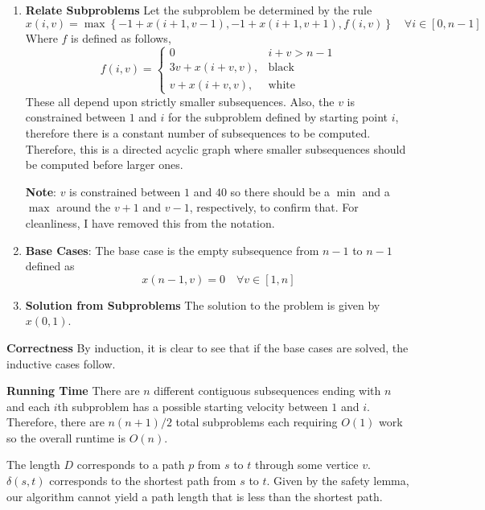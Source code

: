 \documentclass[12pt,twoside]{article}
\begin{document}
\begin{problems}
\begin{enumerate}
    \item {\bf Relate Subproblems} Let the subproblem be determined by the rule
    $$ x(i, v) = \max\left\{ -1 + x(i + 1, v - 1), -1 + x(i + 1, v +
    1), f(i, v) \right\}\quad \forall i \in [0, n - 1] $$
    Where $f$ is defined as follows,
    $$ f(i, v) = \begin{cases}
      0 & i + v > n - 1 \\
      3v + x(i + v, v), & \mathrm{black} \\
      v + x(i + v, v), & \mathrm{white}
    \end{cases} $$
    These all depend upon strictly smaller subsequences. Also, the $v$ is
    constrained between $1$ and $i$ for the subproblem defined by starting
    point $i$, therefore there is a constant number of subsequences to be
    computed. Therefore, this is a directed acyclic graph where smaller
    subsequences should be computed before larger ones.

    {\bf Note}: $v$ is constrained between $1$ and $40$ so there should be a
    $\min$ and a $\max$ around the $v + 1$ and $v - 1$, respectively, to
    confirm that. For cleanliness, I have removed this from the notation.

    \item {\bf Base Cases}: The base case is the empty subsequence from $n -
    1$ to $n - 1$ defined as
    $$ x(n - 1, v) = 0 \quad \forall v \in [1, n] $$

    \item {\bf Solution from Subproblems} The solution to the problem is
    given by $x(0, 1)$.

  \end{enumerate}

{\bf Correctness} By induction, it is clear to see that if the base cases
are solved, the inductive cases follow.

{\bf Running Time} There are $n$ different contiguous subsequences ending
with $n$ and each $i$th subproblem has a possible starting velocity between
$1$ and $i$. Therefore, there are $n (n + 1) / 2$ total subproblems each
requiring $O(1)$ work so the overall runtime is $O(n)$.

\newpage
\problem 

\begin{problemparts}
\problempart The length $D$ corresponds to a path $p$ from $s$ to $t$ through
some vertice $v$. $\delta(s, t)$ corresponds to the shortest path from $s$ to
$t$. Given by the safety lemma, our algorithm cannot yield a path length that
is less than the shortest path.


\end{problemparts}
\end{problems}
\end{document}

